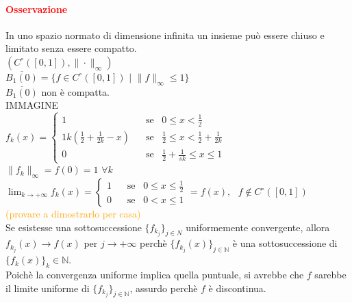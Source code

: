 \documentclass{article}
\newcommand{\N}{\mathbb{N}}
\begin{document}
\paragraph{\textcolor{red}{Osservazione}}
In uno spazio normato di dimensione infinita un insieme può essere chiuso e limitato senza essere compatto.\\
$(C^\circ([0,1]),\|\cdot\|_\infty)$\\
$\overline{B_1(0)}=\{f\in C^\circ ([0,1])\,\, |\,\, \|f\|_\infty\leq 1\}$\\
$\overline{B_1(0)}$ non è compatta.\\
IMMAGINE\\
$f_k(x)=\begin{cases}
    1\,\,\,\,\, &\text{se} \,\,\,\,\,0\leq x <\frac{1}{2}\\
    1k(\frac{1}{2}+\frac{1}{2k}-x)\,\,\,\,\, &\text{se} \,\,\,\,\, \frac{1}{2}\leq x <\frac{1}{2}+\frac{1}{2k}\\
    0 \,\,\,\,\, &\text{se} \,\,\,\,\, \frac{1}{2}+\frac{1}{sk}\leq x \leq 1
\end{cases}$\\
$\|f_k\|_\infty=f(0)=1\,\, \forall k$\\
$\lim_{k \rightarrow +\infty} f_k(x) = \begin{cases}
   1 \,\,\,\,\, &\text{se} \,\,\,\,\, 0\leq x \leq \frac{1}{2} \\
   0 \,\,\,\,\, &\text{se} \,\,\,\,\, 0 < x \leq 1
\end{cases} = f(x),\,\,\,\, f \notin C^\circ([0,1])$\\
\textcolor{orange}{(provare a dimostrarlo per casa)}\\
Se esistesse una sottosuccessione $\{f_{k_j}\}_{j\in N}$ uniformemente convergente, allora $f_{k_j}(x)\rightarrow f(x)$ per $j \rightarrow +\infty$ perchè $\{f_{k_j}(x)\}_{j\in\N}$ è una sottosuccessione di $\{f_k(x)\}_k\in\N$.\\
Poichè la convergenza uniforme implica quella puntuale, si avrebbe che $f$ sarebbe il limite uniforme di $\{f_{k_j}\}_{j\in\N}$, assurdo perchè $f$ è discontinua. 
\end{document}
